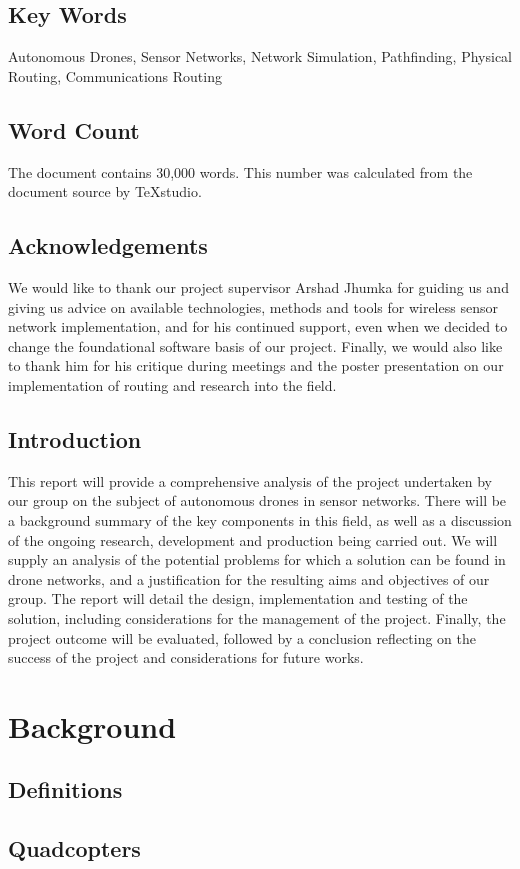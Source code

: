 \documentclass[12pt,a4paper,twoside]{report}
\begin{document}
	\section{Key Words}
	Autonomous Drones, Sensor Networks, Network Simulation, Pathfinding, Physical Routing, Communications Routing
	\section{Word Count}
	The document contains 30,000 words. This number was calculated from the document source by TeXstudio.
	\section{Acknowledgements}
	We would like to thank our project supervisor Arshad Jhumka for guiding us and giving us advice on available technologies, methods and tools for wireless sensor network implementation, and for his continued support, even when we decided to change the foundational software basis of our project. Finally, we would also like to thank him for his critique during meetings and the poster presentation on our implementation of routing and research into the field.
	\section{Introduction}
	This report will provide a comprehensive analysis of the project undertaken by our group on the subject of autonomous drones in sensor networks. There will be a background summary of the key components in this field, as well as a discussion of the ongoing research, development and production being carried out. We will supply an analysis of the potential problems for which a solution can be found in drone networks, and a justification for the resulting aims and objectives of our group. The report will detail the design, implementation and testing of the solution, including considerations for the management of the project. Finally, the project outcome will be evaluated, followed by a conclusion reflecting on the success of the project and considerations for future works.

\chapter{Background}
	\section{Definitions}
	\section{Quadcopters}
\end{document}
